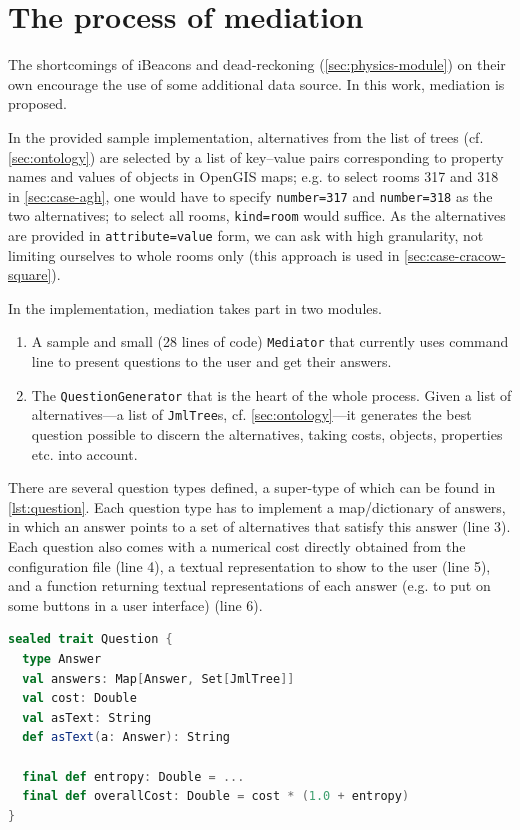 \section{The process of mediation}
\label{sec:mediation}

The shortcomings of iBeacons and dead-reckoning (\cref{sec:physics-module}) on their own encourage the use of some additional data source. In this work, mediation is proposed.

In the provided sample implementation, alternatives from the list of trees (cf. \cref{sec:ontology}) are selected by a list of key--value pairs corresponding to property names and values of objects in OpenGIS maps; e.g. to select rooms 317 and 318 in \cref{sec:case-agh}, one would have to specify \texttt{number=317} and \texttt{number=318} as the two alternatives; to select all rooms, \texttt{kind=room} would suffice. As the alternatives are provided in \texttt{attribute=value} form, we can ask with high granularity, not limiting ourselves to whole rooms only (this approach is used in \cref{sec:case-cracow-square}).

In the implementation, mediation takes part in two modules.

\begin{enumerate}
	\item A sample and small (28 lines of code) \texttt{Mediator} that currently uses command line to present questions to the user and get their answers.
	\item The \texttt{QuestionGenerator} that is the heart of the whole process. Given a list of alternatives---a list of \texttt{JmlTree}s, cf. \cref{sec:ontology}---it generates the best question possible to discern the alternatives, taking costs, objects, properties etc. into account.
\end{enumerate}

There are several question types defined, a super-type of which can be found in \cref{lst:question}. Each question type has to implement a map/dictionary of answers, in which an answer points to a set of alternatives that satisfy this answer (line 3). Each question also comes with a numerical cost directly obtained from the configuration file (line 4), a textual representation to show to the user (line 5), and a function returning textual representations of each answer (e.g. to put on some buttons in a user interface) (line 6).

\begin{lstlisting}[language=Scala,caption={Definition of a question super-type.},label=lst:question]
sealed trait Question {
  type Answer
  val answers: Map[Answer, Set[JmlTree]]
  val cost: Double
  val asText: String
  def asText(a: Answer): String

  final def entropy: Double = ...
  final def overallCost: Double = cost * (1.0 + entropy)
}
\end{lstlisting}

